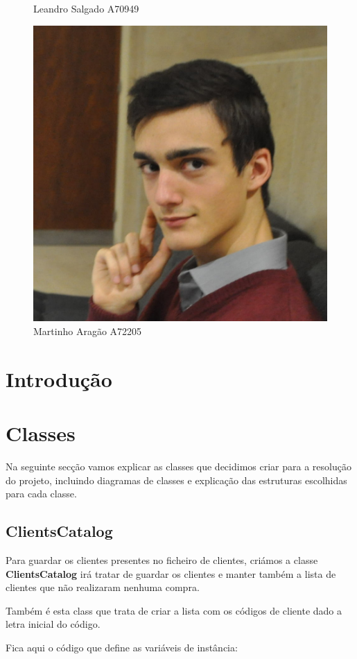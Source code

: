 \documentclass[10pt] {article}
\begin{document}
\begin{figure}[!htb]
  \caption{Leandro Salgado A70949}\label{fig:awesome_image2}
\endminipage\hfill
{}%
  \includegraphics[width=\linewidth]{ma.jpg}
  \caption{Martinho Aragão A72205}
\endminipage
\end{figure}

\newpage

\tableofcontents

\newpage

\section{Introdução}

\newpage
\section{Classes}
Na seguinte secção vamos explicar as classes que decidimos criar para a resolução do projeto, incluindo diagramas 
de classes e explicação das estruturas escolhidas para cada classe.

\subsection{ClientsCatalog}
\par Para guardar os clientes presentes no ficheiro de clientes, criámos a classe \textbf{ClientsCatalog} irá tratar de guardar 
os clientes e manter também a lista de clientes que não realizaram nenhuma compra.
\par Também é esta class que trata de criar a lista com os códigos de cliente dado a letra inicial do código.
\par Fica aqui o código que define as variáveis de instância:
\end{document}
